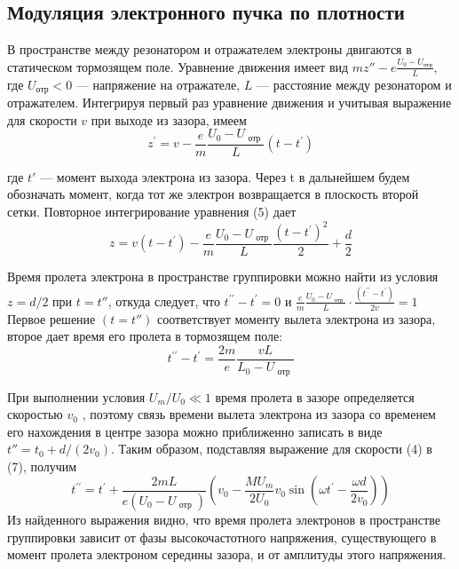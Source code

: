 \subsection{Модуляция электронного пучка по плотности}
В пространстве между резонатором и отражателем электроны двигаются в статическом тормозящем поле. Уравнение движения имеет вид 
$\displaystyle mz''- e \frac { U _ { 0 } - U _ { \text{отр} } } { L }$, где $U_{\text{отр}} < 0$ — напряжение на отражателе, $L$ — расстояние между резонатором и отражателем. Интегрируя первый раз уравнение дви­жения и учитывая выражение для скорости $v$ при выходе из зазора, имеем
\begin{equation}
	z ^ { \prime } = v - \frac { e } { m } \frac { U _ { 0 } - U _ { \text { отр } } } { L } \left( t - t ^ { \prime } \right)
\end{equation}

где $t'$ — момент выхода электрона из зазора. Через t в дальнейшем будем
обозначать момент, когда тот же электрон возвращается в плоскость второй
сетки. Повторное интегрирование уравнения (5) дает
\begin{equation}
	z = v \left( t - t ^ { \prime } \right) - \frac { e } { m } \frac { U _ { 0 } - U _ { \text { отр } } } { L } \frac { \left( t - t ^ { \prime } \right) ^ { 2 } } { 2 } + \frac { d } { 2 }
\end{equation}

Время пролета электрона в пространстве группировки можно найти из
условия $z = d / 2$ при $t=t''$, откуда следует, что 
$t ^ { \prime \prime } - t ^ { \prime } = 0$ и 
$\displaystyle \frac { e } { m } \frac { U _ { 0 } - U _ { \text { отр } } } { L }\cdot \frac { \left( t ^ { \prime \prime } - t ^ { \prime } \right) } { 2 v } = 1$
Первое решение $(t = t'' )$ соответствует моменту вылета элек­трона из зазора, второе дает время его пролета в тормозящем поле:
\begin{equation}
	t ^ { \prime \prime } - t ^ { \prime } = \frac { 2 m } { e } \frac { v L } { L _ { 0 } - U _ { \text { отр } } }
\end{equation}

При выполнении условия $U_{ m } / U _{ 0 } \ll 1$ время пролета в зазоре определяется
скоростью $v_0$ , поэтому связь времени вылета электрона из зазора со време­нем его нахождения в центре зазора можно приближенно записать в виде
$t'' = t _ { 0 } + d / \left( 2 v _ { 0 } \right)$. Таким образом, подставляя выражение для скорости (4) в
(7), получим
\begin{equation}
	t ^ { \prime \prime } = t ^ { \prime } + \frac { 2 m L } { e \left( U _ { 0 } - U _ { \text { отр } } \right) } \left( v _ { 0 } - \frac { M U _ { m } } { 2 U _ { 0 } } v _ { 0 } \sin \left( \omega t ^ { \prime } - \frac { \omega d } { 2 v _ { 0 } } \right) \right)
\end{equation}
Из найденного выражения видно, что время пролета электронов в про­странстве группировки зависит от фазы высокочастотного напряжения, су­ществующего в момент пролета электроном середины зазора, и от амплиту­ды этого напряжения.

